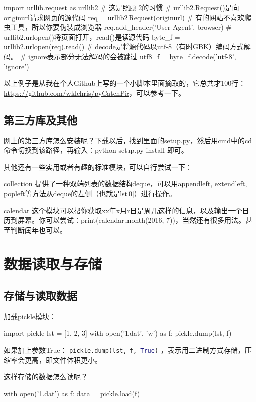 \documentclass[a4paper,12pt]{report}
\newcommand{\pyline}[1]{{ \lstinline[language=Python, basicstyle=\ttfamily]{#1} }}
\newcommand{\python}{{\ttfamily{Python}}}
\newenvironment{fead}{\begin{description}[font=\bfseries\uline]}
    {\end{description}}
\begin{document}
\begin{py}
import urllib.request as urllib2 # 这是照顾\python{} 2的习惯
# urllib2.Request()是向originurl请求网页的源代码
req = urllib2.Request(originurl)
# 有的网站不喜欢爬虫工具，所以你要伪装成浏览器
req.add_header('User-Agent', browser)
# urllib2.urlopen()将页面打开，read()是读源代码
byte_f = urllib2.urlopen(req).read()
# decode是将源代码以utf-8（有时GBK）编码方式解码。
    # ignore表示部分无法解码的会被跳过
utf8_f = byte_f.decode('utf-8', 'ignore')
\end{py}

以上例子是从我在个人Github上写的一个小脚本里面摘取的，它总共才100行：\url{https://github.com/wklchris/pyCatchPic}，可以参考一下。

\section{第三方库及其他}
网上的第三方库怎么安装呢？下载以后，找到里面的setup.py，然后用cmd中的cd命令切换到该路径，再输入：python setup.py install 即可。

其他还有一些实用或者有趣的标准模块，可以自行尝试一下：
\begin{fead}
\item[collection] 提供了一种双端列表的数据结构deque，可以用appendleft, extendleft, popleft等方法从deque的左侧（也就是lst[0]）进行操作。
\item[calendar] 这个模块可以帮你获取xx年x月x日是周几这样的信息，以及输出一个日历到屏幕。你可以尝试：print(calendar.month(2016, 7))，当然还有很多用法。甚至判断闰年也可以。
\end{fead}

\chapter{数据读取与存储}
\section{存储与读取数据}
加载pickle模块：
\begin{py}
import pickle
lst = [1, 2, 3]
with open('1.dat', 'w') as f:
    pickle.dump(lst, f)
\end{py}

如果加上参数True：\pyline{pickle.dump(lst, f, True)}，表示用二进制方式存储，压缩率会更高，即文件体积更小。

这样存储的数据怎么读呢？
\begin{py}
with open('1.dat') as f:
    data = pickle.load(f)
\end{py}
\end{document}
